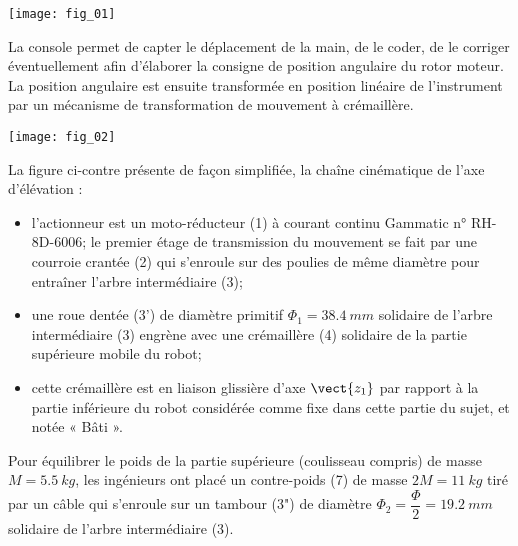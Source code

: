 \begin{center}
\texttt{[image: fig\_01]}
\end{center}

La console permet de capter le déplacement de la main, de le coder, de le corriger éventuellement afin d’élaborer la consigne de position angulaire du rotor moteur. 
La position angulaire est ensuite transformée en position linéaire de l’instrument par un mécanisme de transformation de mouvement à crémaillère.


\begin{marginfigure}
\texttt{[image: fig\_02]}
\end{marginfigure}

La figure ci-contre présente de façon simplifiée, la chaîne cinématique de l’axe d’élévation :
\begin{itemize}
\item l’actionneur est un moto-réducteur (1) à courant continu Gammatic n° RH-8D-6006;
le premier étage de transmission du mouvement se fait par une courroie crantée (2) qui s’enroule sur des poulies de même diamètre pour entraîner l’arbre intermédiaire (3);
\item une roue dentée (3’) de diamètre primitif $\Phi_1 = \SI{38,4}{mm}$ solidaire de l’arbre intermédiaire (3) engrène avec une crémaillère (4) solidaire de la partie supérieure mobile du robot;
\item cette crémaillère est en liaison glissière d’axe $\vect{z_1}$ par rapport à la partie inférieure du robot considérée comme fixe dans cette partie du sujet, et notée « Bâti ».
\end{itemize}

Pour équilibrer le poids de la partie supérieure (coulisseau compris) de masse $M = \SI{5,5}{kg}$, les ingénieurs ont placé un contre-poids (7) de masse $2M = \SI{11}{kg}$ tiré par un câble qui s’enroule sur un tambour (3") de diamètre $\Phi_2 = \dfrac{\Phi}{2} = \SI{19,2}{mm}$ solidaire de  l’arbre intermédiaire (3).





